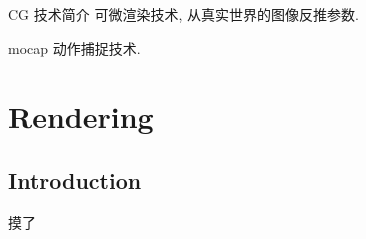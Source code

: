 \newpage
CG 技术简介
可微渲染技术, 从真实世界的图像反推参数.

mocap 动作捕捉技术.

\section{Rendering}
\subsection{Introduction}
摸了